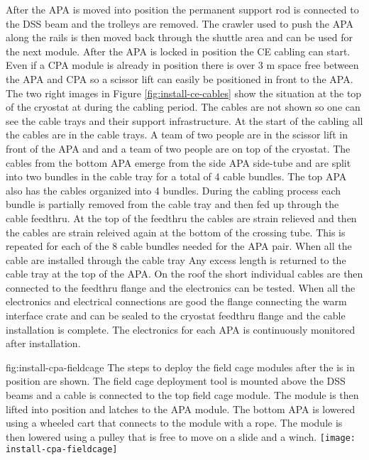 After the APA is moved into position the permanent support rod is connected to the DSS beam and the trolleys are removed. The crawler used to push the APA along the rails is then moved back through the shuttle area and can be used for the next module. After the APA is locked in position the CE cabling can start. Even if a CPA module is already in position there is over 3 \si{m} space free between the APA and CPA so a scissor lift can easily be positioned in front to the APA. The two right images in Figure \ref{fig:install-ce-cables} show the situation at the top of the cryostat at during the cabling period. The cables are not shown so one can see the cable trays and their support infrastructure. At the start of the cabling all the cables are in the cable trays. A team of two people are in the scissor lift in front of the APA and  and a team of two people are on top of the cryostat. The cables from the bottom APA emerge from the side APA side-tube and are split into two bundles in the cable tray for a total of 4 cable bundles. The top APA also has the cables organized into 4 bundles. During the cabling process each bundle is partially removed from the cable tray and then fed up through the cable feedthru. At the top of the feedthru the cables are strain relieved and then the cables are strain releived again at the bottom of the crossing tube. This is repeated for each of the 8 cable bundles needed for the APA pair. When all the cable are installed through the cable tray Any excess length is returned to the cable tray at the top of the APA. On the roof the short individual cables are then connected to the feedthru flange and the electronics can be tested. When all the electronics and electrical connections are good the flange connecting the warm interface crate and can be sealed to the cryostat feedthru flange and the cable installation is complete. The electronics for each APA is continuously monitored after installation. 

\begin{dunefigure}{fig:install-cpa-fieldcage}
  {The steps to deploy the field cage modules after the  is in position are shown. The field cage deployment tool is mounted above the DSS beams and a cable is connected to the top field cage module. The module is then lifted into position and latches to the APA module. The bottom APA is lowered using a wheeled cart that connects to the module with a rope. The module is then lowered using a pulley that is free to move on a slide and a winch.}
\texttt{[image: install-cpa-fieldcage]}
\end{dunefigure}






